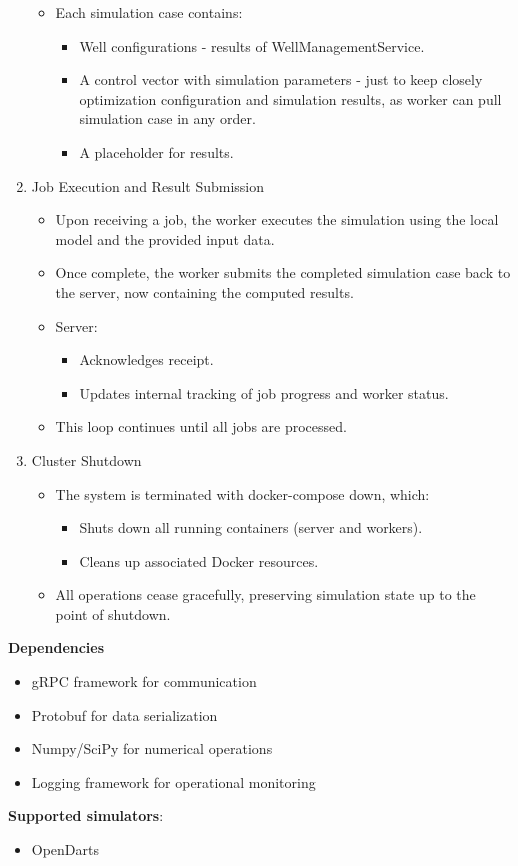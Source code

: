 \begin{enumerate}
\begin{itemize}
\begin{itemize}
		\end{itemize}
		\item Each simulation case contains:
		\begin{itemize}
			\item Well configurations - results of WellManagementService.
			\item A control vector with simulation parameters - just to keep closely optimization configuration and simulation results, as worker can pull simulation case in any order.
			\item A placeholder for results.
		\end{itemize}
	\end{itemize}
	\item Job Execution and Result Submission
	\begin{itemize}
		\item Upon receiving a job, the worker executes the simulation using the local model and the provided input data.
		\item Once complete, the worker submits the completed simulation case back to the server, now containing the computed results.
		\item Server:
		\begin{itemize}
			\item Acknowledges receipt.
			\item Updates internal tracking of job progress and worker status.
		\end{itemize}
		\item This loop continues until all jobs are processed.
	\end{itemize}
	\item Cluster Shutdown
	\begin{itemize}
		\item The system is terminated with docker-compose down, which:
		\begin{itemize}
			\item Shuts down all running containers (server and workers).
			\item Cleans up associated Docker resources.
		\end{itemize}
		\item All operations cease gracefully, preserving simulation state up to the point of shutdown.
	\end{itemize}
\end{enumerate}

\bigskip
\textbf{Dependencies}

\begin{itemize}
	\item gRPC framework for communication
	\item Protobuf for data serialization
	\item Numpy/SciPy for numerical operations
	\item Logging framework for operational monitoring
\end{itemize}

\bigskip
\textbf{Supported simulators}:
\begin{itemize}
	\item OpenDarts
\end{itemize}
